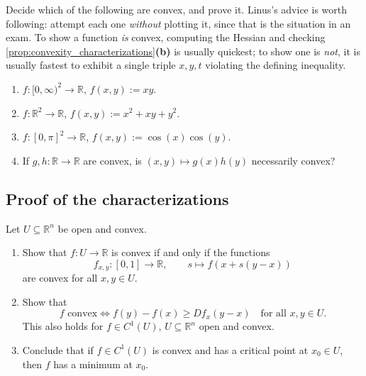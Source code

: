 \begin{exercise}
\label{ex:convex_or_not}
Decide which of the following are convex, and prove it. Linus's advice is worth following:
attempt each one \emph{without} plotting it, since that is the situation in an exam. To show a
function \emph{is} convex, computing the Hessian and checking
\cref{prop:convexity_characterizations}\textbf{(b)} is usually quickest; to show one is
\emph{not}, it is usually fastest to exhibit a single triple $x, y, t$ violating the defining
inequality.
\begin{enumerate}[label=\textbf{(\alph*)}]
  \item $f : [0,\infty)^2 \to \mathbb{R}$, $f(x,y) := xy$.
  \item $f : \mathbb{R}^2 \to \mathbb{R}$, $f(x,y) := x^2+xy+y^2$.
  \item $f : [0,\pi]^2 \to \mathbb{R}$, $f(x,y) := \cos(x)\cos(y)$.
  \item If $g, h : \mathbb{R} \to \mathbb{R}$ are convex, is $(x,y) \mapsto g(x)h(y)$ necessarily
    convex?
\end{enumerate}
\end{exercise}

\subsection{Proof of the characterizations}

\begin{exercise}
\label{ex:convexity_characterizations}
Let $U \subseteq \mathbb{R}^n$ be open and convex.
\begin{enumerate}[label=\textbf{(\alph*)}]
  \item Show that $f : U \to \mathbb{R}$ is convex if and only if the functions
    \[f_{x,y} : [0,1] \to \mathbb{R}, \qquad s \mapsto f(x+s(y-x))\]
    are convex for all $x,y \in U$.
  \item Show that
    \[f \text{ convex} \iff f(y)-f(x) \geq Df_x(y-x) \quad \text{for all } x,y \in U.\]
    This also holds for $f \in C^1(U)$, $U \subseteq \mathbb{R}^n$ open and convex.
  \item Conclude that if $f \in C^1(U)$ is convex and has a critical point at $x_0 \in U$, then $f$
    has a minimum at $x_0$.
\end{enumerate}
\end{exercise}

